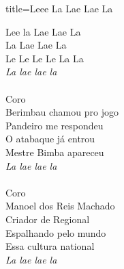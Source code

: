 \documentclass[fontsize=14pt, twoside]{scrreprt}
\begin{document}
\begin{multicols*}{2}
\begin{song}{title={Leee La Lae Lae La}}
        \begin{verse*}
            Lee la Lae Lae La\\
            La Lae Lae La\\
            Le Le Le Le La La\\
            \textit{La lae lae la}\\
\\
            Coro\\
            Berimbau chamou pro jogo\\
            Pandeiro me respondeu\\
            O atabaque já entrou\\
            Mestre Bimba apareceu\\
            \textit{La lae lae la}\\
\\
            Coro\\
            Manoel dos Reis Machado\\
            Criador de Regional\\
            Espalhando pelo mundo\\
            Essa cultura national\\
            \textit{La lae lae la}\\


\end{verse*}
\end{song}
\end{multicols*}
\end{document}
